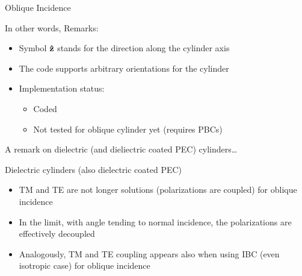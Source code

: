 \begin{frame}[allowframebreaks]{Oblique Incidence}
\begin{block}{In other words,}
      Remarks:
      \begin{itemize}
      \item Symbol $\mathbf{\hat{z}}$ stands for the direction along the
        cylinder axis
      \item The code supports arbitrary orientations for the cylinder
      \end{itemize}
    \end{block}

    \begin{itemize}
    \item Implementation status:
      \begin{itemize}
      \item Coded
      \item Not tested for oblique cylinder yet (requires PBCs)
      \end{itemize}
    \end{itemize}
      

    \framebreak %

   \large{A remark on dielectric (and dieliectric coated PEC) cylinders\ldots}
    
   \begin{block}{Dielectric cylinders (also dielectric coated PEC)}
     \begin{itemize}
     \item TM and TE are not longer solutions (\alert{polarizations are
       coupled})  for oblique incidence

   \item In the limit, with angle tending to normal incidence, the
     polarizations are effectively decoupled

   \item Analogously, TM and TE coupling appears also when using IBC (even
     isotropic case) for oblique incidence

     \end{itemize}
   \end{block}

  
\end{frame}
  

